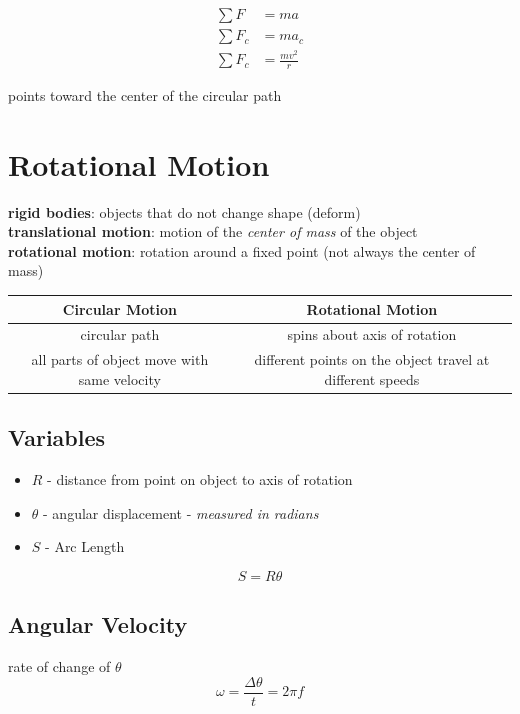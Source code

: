 \documentclass[titlepage]{article}
\begin{document}
\begin{align*}
    \sum F   & = ma             \\
    \sum F_c & = ma_c           \\
    \sum F_c & = \frac{mv^2}{r}
\end{align*}

points toward the center of the circular path

\section{Rotational Motion}

\textbf{rigid bodies}: objects that do not change shape (deform)\\
\textbf{translational motion}: motion of the \emph{center of mass} of the object\\
\textbf{rotational motion}: rotation around a fixed point (not always the center of mass)
\ \\
\begin{table}[H]
    \makegapedcells
    \begin{tabular}{c|c}
        \textbf{Circular Motion}                    & \textbf{Rotational Motion}                                \\
        \hline

        circular path                               & spins about axis of rotation                              \\
        all parts of object move with same velocity & different points on the object travel at different speeds \\
    \end{tabular}
\end{table}

\subsection{Variables}
\begin{itemize}
    \item $R$ - distance from point on object to axis of rotation
    \item $\theta$ - angular displacement - \emph{measured in radians}
    \item $S$ - Arc Length
\end{itemize}
\[S = R\theta\]

\subsection{Angular Velocity}
rate of change of $\theta$
\[ \omega = \frac{\Delta \theta}{t} = 2 \pi f \]
\end{document}
